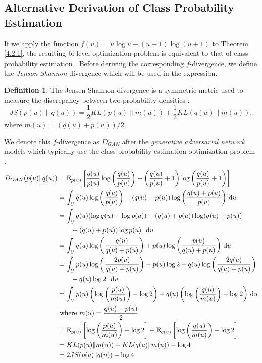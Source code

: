 \documentclass[honours,12pt, twoside]{unswthesis}
\newcommand{\E}{\mathbb{E}}
\numberwithin{equation}{section}
\theoremstyle{definition}
\newtheorem{definition}[theorem]{Definition}
\begin{document}
\subsection{Alternative Derivation of Class Probability Estimation}\label{sec:4.2.4}
If we apply the function $f(u)=u\log u-(u+1)\log (u+1)$ to Theorem \ref{4.2.1}, the resulting bi-level optimization problem is equivalent to that of class probability estimation \citep{tiao}. Before deriving the corresponding $f$-divergence, we define the \textit{Jenson-Shannon} divergence which will be used in the expression.
\begin{definition}
The Jensen-Shannon divergence is a symmetric metric used to measure the discrepancy between two probability densities \citep{JS}:
\[JS(p(u)\|q(u))=\frac12 KL(p(u)\|m(u))+\frac12 KL(q(u)\|m(u)),\]
where $m(u)=(q(u)+p(u))/2$.
\end{definition}
We denote this $f$-divergence as $D_{GAN}$ after the \textit{generative adversarial network} models which typically use the class probability estimation optimization problem \citep{gan}.
\begin{align*}
D_{GAN}(p(u)\|q(u))&= \E_{p(u)}\left[\frac{q(u)}{p(u)}\log \left(\frac{q(u)}{p(u)}\right)-\left(\frac{q(u)}{p(u)}+1 \right)\log\left(\frac{q(u)}{p(u)}+1\right)\right]\\
&= \int_U q(u)\log\left(\frac{q(u)}{p(u)}\right)-(q(u)+p(u))\log\left(\frac{q(u)+p(u)}{p(u)}\right)\,{\rm d}u\\
&= \int_U q(u)(\log q(u)-\log p(u))-(q(u)+p(u))\log(q(u)+p(u))\\
&\qquad +(q(u)+p(u))\log p(u)\enskip \,{\rm d}u\\
&= \int_U q(u)\log\left(\frac{q(u)}{q(u)+p(u)}\right)+p(u)\log \left(\frac{p(u)}{q(u)+p(u)}\right) \,{\rm d}u\\
&= \int_U p(u)\log \left(\frac{2p(u)}{q(u)+p(u)}\right)-p(u)\log 2+q(u)\log \left(\frac{2q(u)}{q(u)+p(u)}\right)\\
&\qquad -q(u)\log 2\enskip \,{\rm d}u\\
&= \int_U p(u)\left(\log \left(\frac{p(u)}{m(u)}\right)-\log 2\right)+q(u)\left(\log \left(\frac{q(u)}{m(u)}\right)-\log 2\right)\,{\rm d}u\\
&\text{ where }m(u)=\frac{q(u)+p(u)}{2}\\
&= \E_{p(u)} \left[\log \left(\frac{p(u)}{m(u)}\right)-\log 2\right]+\E_{q(u)}\left[\log\left(\frac{q(u)}{m(u)}\right)-\log 2\right]\\
&= KL(p(u)\|m(u))+KL(q(u)\|m(u))-\log 4\\
&= 2JS(p(u)\|q(u))-\log 4.
\end{align*}
\end{document}
